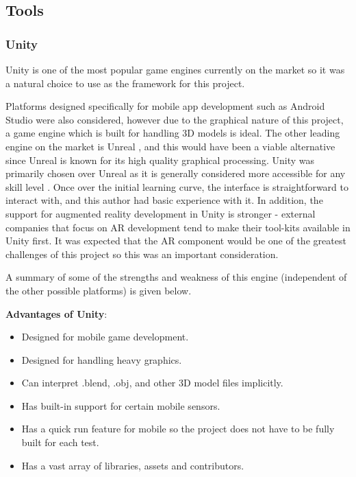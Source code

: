 \documentclass[12pt, a4paper]{article}
\begin{document}
\subsection{Tools}
\subsubsection{Unity}
Unity is one of the most popular game engines currently on the market \cite{design:unity} so it was a natural choice to use as the framework for this project. 

Platforms designed specifically for mobile app development such as Android Studio \cite{design:android} were also considered, however due to the graphical nature of this project, a game engine which is built for handling 3D models is ideal. The other leading engine on the market is Unreal \cite{design:unreal}, and this would have been a viable alternative since Unreal is known for its high quality graphical processing. Unity was primarily chosen over Unreal as it is generally considered more accessible for any skill level \cite{design:unrealvsunity}. Once over the initial learning curve, the interface is straightforward to interact with, and this author had basic experience with it. In addition, the support for augmented reality development in Unity is stronger - external companies that focus on AR development tend to make their tool-kits available in Unity first. It was expected that the AR component would be one of the greatest challenges of this project so this was an important consideration.

A summary of some of the strengths and weakness of this engine (independent of the other possible platforms) is given below.

\newpage
\textbf{Advantages of Unity}:
\begin{itemize}
    \item Designed for mobile game development.
    \item Designed for handling heavy graphics.
    \item Can interpret .blend, .obj, and other 3D model files implicitly.
    \item Has built-in support for certain mobile sensors.
    \item Has a quick run feature for mobile so the project does not have to be fully built for each test. 
    \item Has a vast array of libraries, assets and contributors.
\end{itemize}
\end{document}
